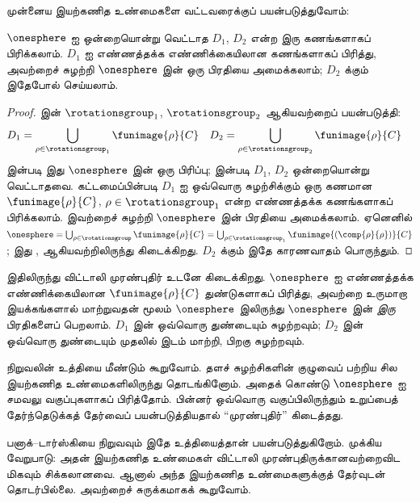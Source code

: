\documentclass[../../../include/open-logic-section]{subfiles}
\begin{document}
முன்னைய இயற்கணித உண்மைகளை வட்டவரைக்குப் பயன்படுத்துவோம்:

\begin{lem}
$\onesphere$ ஐ ஒன்றையொன்று வெட்டாத $D_{1}$,
$D_{2}$ என்ற இரு கணங்களாகப் பிரிக்கலாம். $D_{1}$ ஐ
எண்ணத்தக்க எண்ணிக்கையிலான கணங்களாகப் பிரித்து, அவற்றைச்
சுழற்றி $\onesphere$ இன் ஒரு பிரதியை அமைக்கலாம்;
$D_{2}$ க்கும் இதேபோல் செய்யலாம்.
\end{lem}

\begin{proof}
 இன் $\rotationsgroup_{1}$,
$\rotationsgroup_{2}$ ஆகியவற்றைப் பயன்படுத்தி:
\begin{align*}
	D_{1} &= \bigcup_{\rho \in \rotationsgroup_1} \funimage{\rho}{C} &
	D_{2} &= \bigcup_{\rho \in \rotationsgroup_2} \funimage{\rho}{C}
\end{align*}
 இன்படி இது $\onesphere$ இன்
ஒரு பிரிப்பு;  இன்படி $D_1$,
$D_2$ ஒன்றையொன்று வெட்டாதவை. கட்டமைப்பின்படி $D_1$
ஐ ஒவ்வொரு சுழற்சிக்கும் ஒரு கணமான
$\funimage{\rho}{C}$, $\rho \in \rotationsgroup_1$ என்ற
எண்ணத்தக்க கணங்களாகப் பிரிக்கலாம். இவற்றைச் சுழற்றி
$\onesphere$ இன் பிரதியை அமைக்கலாம். ஏனெனில்
$\onesphere = \bigcup_{\rho \in
\rotationsgroup}\funimage{\rho}{C} = \bigcup_{\rho \in
\rotationsgroup_1}\funimage{(\comp{\rho}{\rho})}{C}$;
இது , 
ஆகியவற்றிலிருந்து கிடைக்கிறது. $D_2$ க்கும் இதே
காரணவாதம் பொருந்தும்.
\end{proof}\noindent
இதிலிருந்து விட்டாலி முரண்புதிர் உடனே கிடைக்கிறது.
$\onesphere$ ஐ எண்ணத்தக்க எண்ணிக்கையிலான
$\funimage{\rho}{C}$ துண்டுகளாகப் பிரித்து,
அவற்றை உருமாறா இயக்கங்களால் மாற்றுவதன் மூலம்
$\onesphere$ இலிருந்து $\onesphere$ இன் \emph{இரு} பிரதிகளைப்
பெறலாம். $D_1$ இன் ஒவ்வொரு துண்டையும் சுழற்றவும்;
$D_2$ இன் ஒவ்வொரு துண்டையும் முதலில் இடம் மாற்றி,
பிறகு சுழற்றவும்.

நிறுவலின் உத்தியை மீண்டும் கூறுவோம். தளச் சுழற்சிகளின்
குழுவைப் பற்றிய சில இயற்கணித உண்மைகளிலிருந்து
தொடங்கினோம். அதைக் கொண்டு $\onesphere$ ஐ சமவலு
வகுப்புகளாகப் பிரித்தோம். பின்னர் ஒவ்வொரு வகுப்பிலிருந்தும்
உறுப்பைத் தேர்ந்தெடுக்கத் தேர்வைப் பயன்படுத்தியதால்
``முரண்புதிர்'' கிடைத்தது.

பனாக்--டார்ஸ்கியை நிறுவவும் இதே உத்தியைத்தான்
பயன்படுத்துகிறோம். முக்கிய வேறுபாடு: அதன் இயற்கணித
உண்மைகள் விட்டாலி முரண்புதிருக்கானவற்றைவிட மிகவும்
சிக்கலானவை. ஆனால் அந்த இயற்கணித உண்மைகளுக்குத்
தேர்வுடன் தொடர்பில்லை. அவற்றைச் சுருக்கமாகக் கூறுவோம்.
\end{document}
